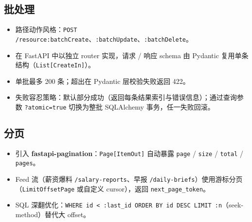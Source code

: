\documentclass[11pt,a4paper]{ctexart}
\begin{document}
\subsection{批处理}
\begin{itemize}[leftmargin=2em]
    \item 路径动作风格：\texttt{POST /resource:batchCreate}、\texttt{:batchUpdate}、\texttt{:batchDelete}。
    \item 在 FastAPI 中以独立 router 实现，请求 / 响应 schema 由 Pydantic 复用单条结构（\texttt{List[CreateIn]}）。
    \item 单批最多 200 条；超出在 Pydantic 层校验失败返回 422。
    \item 失败容忍策略：默认部分成功（返回每条结果索引与错误信息）；通过查询参数 \texttt{?atomic=true} 切换为整批 SQLAlchemy 事务，任一失败回滚。
\end{itemize}

\subsection{分页}
\begin{itemize}[leftmargin=2em]
    \item 引入 \textbf{fastapi-pagination}：\texttt{Page[ItemOut]} 自动暴露 \texttt{page} / \texttt{size} / \texttt{total} / \texttt{pages}。
    \item Feed 流（薪资爆料 \texttt{/salary-reports}、早报 \texttt{/daily-briefs}）使用游标分页（\texttt{LimitOffsetPage} 或自定义 cursor），返回 \texttt{next\_page\_token}。
    \item SQL 深翻优化：\texttt{WHERE id < :last\_id ORDER BY id DESC LIMIT :n}（seek-method）替代大 offset。
\end{itemize}
\end{document}
